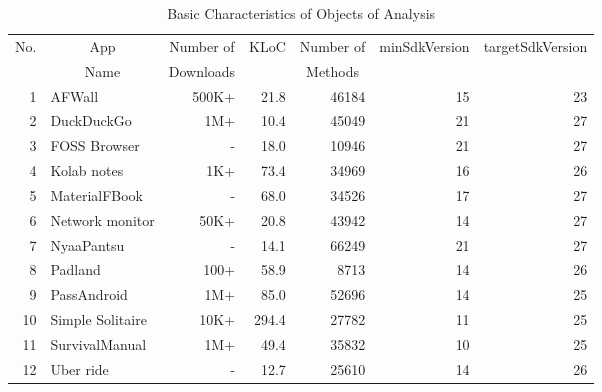 \begin{table*}[t]
\centering
\scriptsize{
\caption {\label{tab:table1} Basic Characteristics of Objects of Analysis} 
\begin{tabular}{|r|l|r|r|r|r|r|} 
\hline
\rule{0pt}{3ex}
No. & \multicolumn{1}{c|}{App} & \multicolumn{1}{c|}{Number of} & \multicolumn{1}{c|}{KLoC} &
\multicolumn{1}{c|}{Number of} & 
\multicolumn{1}{c|}{minSdkVersion} & \multicolumn{1}{c|}{targetSdkVersion} \\ 
& \multicolumn{1}{c|}{Name} & \multicolumn{1}{c|}{Downloads} & & \multicolumn{1}{c|}{Methods} & & \\ 
\hline \hline
\rule{0pt}{3ex}
 1 & AFWall           & 500K+ &  21.8 & 46184 & 15 & 23 \\ 
 2 & DuckDuckGo       & 1M+   &  10.4 & 45049 & 21 & 27 \\ 
 3 & FOSS Browser     & -     &  18.0 & 10946 & 21 & 27 \\ 
 4 & Kolab notes      & 1K+   &  73.4 & 34969 & 16 & 26 \\ 
 5 & MaterialFBook    & -     &  68.0 & 34526 & 17 & 27 \\ 
 6 & Network monitor  & 50K+  &  20.8 & 43942 & 14 & 27 \\ 
 7 & NyaaPantsu       & -     &  14.1 & 66249 & 21 & 27 \\ 
 8 & Padland          & 100+  &  58.9 &  8713 & 14 & 26 \\ 
 9 & PassAndroid      & 1M+   &  85.0 & 52696 & 14 & 25 \\
10 & Simple Solitaire & 10K+  & 294.4 & 27782 & 11 & 25 \\ 
11 & SurvivalManual   & 1M+   &  49.4 & 35832 & 10 & 25 \\
12 & Uber ride        & -     &  12.7 & 25610 & 14 & 26 \\ 
\hline
\end{tabular}
\label{tab:1}
}
\end{table*}
